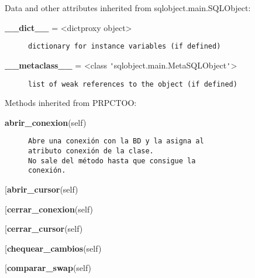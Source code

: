 Data and other attributes inherited from sqlobject.main.SQLObject:\\
\begin{description}\item[{\bf \_\_dict\_\_} = <dictproxy object>]{\tt dictionary~for~instance~variables~(if~defined)}\end{description}

\begin{description}\item[{\bf \_\_metaclass\_\_} = <class \verb|'|sqlobject.main.MetaSQLObject\verb|'|>\end{description}

\begin{description}\item[{\bf \_\_weakref\_\_} = <attribute \verb|'|\_\_weakref\_\_\verb|'| of \verb|'|SQLObject\verb|'| objects>]{\tt list~of~weak~references~to~the~object~(if~defined)}\end{description}


Methods inherited from PRPCTOO:\\
\begin{description}\item[{\bf abrir\_conexion}(self)]{\tt Abre~una~conexión~con~la~BD~y~la~asigna~al~\\
atributo~conexión~de~la~clase.\\
No~sale~del~método~hasta~que~consigue~la\\
conexión.}\end{description}

\begin{description}\item[{\bf abrir\_cursor}(self)\end{description}

\begin{description}\item[{\bf cerrar\_conexion}(self)\end{description}

\begin{description}\item[{\bf cerrar\_cursor}(self)\end{description}

\begin{description}\item[{\bf chequear\_cambios}(self)\end{description}

\begin{description}\item[{\bf comparar\_swap}(self)\end{description}


